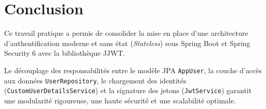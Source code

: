 \documentclass{rapportFSR}
\begin{document}
\section*{Conclusion}
Ce travail pratique a permis de consolider la mise en place d'une architecture d'authentification moderne et sans état (\textit{Stateless}) sous Spring Boot et Spring Security 6 avec la bibliothèque JJWT.

Le découplage des responsabilités entre le modèle JPA \texttt{AppUser}, la couche d'accès aux données \texttt{UserRepository}, le chargement des identités (\texttt{CustomUserDetailsService}) et la signature des jetons (\texttt{JwtService}) garantit une modularité rigoureuse, une haute sécurité et une scalabilité optimale.
\end{document}
